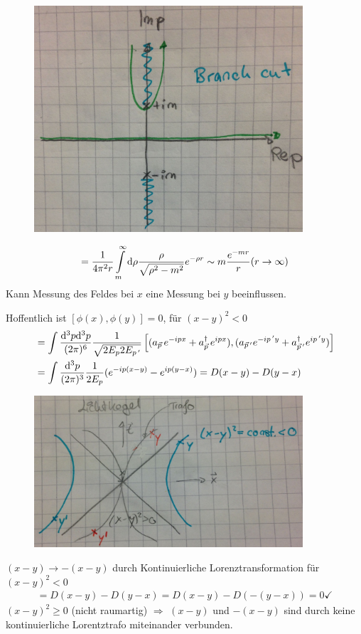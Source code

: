 	\begin{figure} [h]
		\begin{center}
			\includegraphics[width = 10cm]{Kausalitaet}
		\end{center}	
	\end{figure}
\FloatBarrier	         
	\begin{align*}
		= \frac{1}{4 \pi^2 r }\int \limits_m^\infty \mathrm{d} \rho \frac{\rho}{\sqrt{\rho^2 - m^2}} e^{-\rho r} \sim m \frac{e^{-mr}}{r} (r \rightarrow \infty)
	\end{align*} 
Kann Messung des Feldes bei $x$ eine Messung bei $y$ beeinflussen. 

Hoffentlich ist $[\phi(x), \phi(y)] = 0$, für $(x- y)^2 < 0$
	\begin{align*}
		[\phi(x), \phi(y)] &= \int \frac{\diff^3 p \diff^3 p}{(2 \pi)^6} 
		\frac{1}{\sqrt{2 E_p 2E_{p\,'}}}
		\left[
			(a_{\vec{p}} \,e^{-ipx} + a^\dagger_{\vec{p}} \,e^{ipx}), 
			(a_{\vec{p}\,'} e^{-ip\,'y} + a^\dagger_{\vec{p}\,'} e^{ip\,'y})
		\right] \\
		&= \int \frac{\diff^3 p}{(2 \pi)^3} \frac{1}{2 E_p} (e^{-i p(x- y)} - e^{ip (y-x)}) = D(x - y) - D(y-x)
	\end{align*}

	\begin{figure} [h]
		\begin{center}
			\includegraphics[width = 10cm]{Kausalitaet2}
		\end{center}	
	\end{figure}
\FloatBarrier
$(x-y) \rightarrow -(x - y)$ durch Kontinuierliche Lorenztransformation für $(x-y)^2 <0$
	\begin{align*}
		[\phi(x), \phi(y)]	= D(x - y) - D(y - x) = D(x - y) - D(-(y -x)) = 0 \checkmark 
	\end{align*} 
$(x -y)^2 \geq 0$ (nicht raumartig) $\Rightarrow$ $(x- y)$ und $-(x-y)$ sind durch keine kontinuierliche Lorentztrafo miteinander verbunden.

